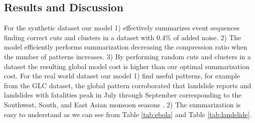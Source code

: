 \subsection{Results and Discussion}

For the synthetic dataset our model 1) effectively summarizes event sequences finding correct cuts and clusters in a dataset with 0.4\% of added noise. 2) The model efficiently performs summarization decreasing the compression ratio when the number of patterns increases. 3) By performing random cuts and clusters in a dataset the resulting global model cost is higher than our optimal summarization cost. For the real world dataset our model 1) find useful patterns, for example from the GLC dataset, the global pattern corroborated that landslide reports and landslides with fatalities peak in July through September corresponding to the Southwest, South, and East Asian
monsoon seasons \cite{Kirschbaum:2010}. 2) The summarization is easy to understand as we can see from Table \ref{tab:ebola} and Table \ref{tab:landslide}.



